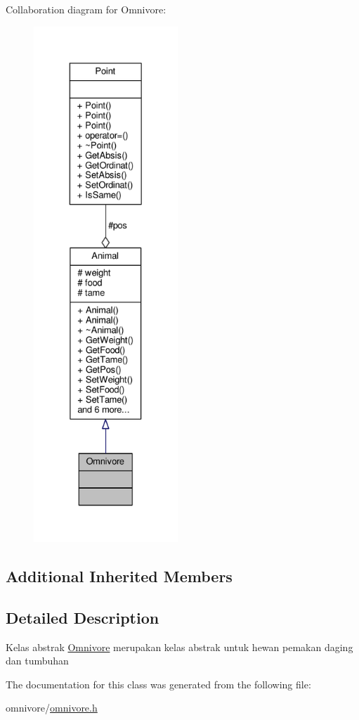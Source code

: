 Collaboration diagram for Omnivore\+:
\nopagebreak
\begin{figure}[H]
\begin{center}
\leavevmode
\includegraphics[height=550pt]{classOmnivore__coll__graph}
\end{center}
\end{figure}
\subsection*{Additional Inherited Members}


\subsection{Detailed Description}
Kelas abstrak \hyperlink{classOmnivore}{Omnivore} merupakan kelas abstrak untuk hewan pemakan daging dan tumbuhan 

The documentation for this class was generated from the following file\+:\begin{DoxyCompactItemize}
\item 
omnivore/\hyperlink{omnivore_8h}{omnivore.\+h}\end{DoxyCompactItemize}
